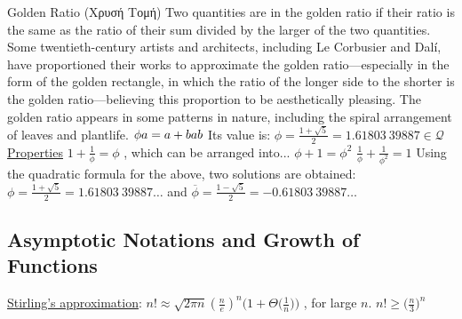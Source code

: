 \documentclass[12pt]{article}
\begin{document}
\begin{flushleft}
	\textbullet \quad Golden Ratio (\textgreek{Χρυσή Τομή}) \linebreak 
   Two quantities are in the golden ratio if their ratio is the same as the ratio of their sum divided by the larger of the two quantities. Some twentieth-century artists and architects, including Le Corbusier and Dalí, have proportioned their works to approximate the golden ratio—especially in the form of the golden rectangle, in which the ratio of the longer side to the shorter is the golden ratio—believing this proportion to be aesthetically pleasing. The golden ratio appears in some patterns in nature, including the spiral arrangement of leaves and plantlife. \linebreak 
   	$\displaystyle \phi \def \frac{a+b}{a} = \frac{a}{b}$ \linebreak 
	Its value is: $\displaystyle \phi = \frac{1+\sqrt{5}}{2} = 1.61803\ 39887 \in \mathcal{Q} $ \linebreak 
	\uline{Properties} \linebreak 
	\textbullet \quad $\displaystyle 1+\frac{1}{\phi} = \phi $ , which can be arranged into... \linebreak 
	\textbullet \quad $\displaystyle \phi +1=\phi ^2$ \linebreak 
	\textbullet \quad $\displaystyle \frac{1}{\phi} + \frac{1}{\phi^2} = 1$ \linebreak 
	\textbullet \quad Using the quadratic formula for the above, two solutions are obtained: \linebreak 
	$\displaystyle \phi =\frac {1+{\sqrt {5}}}{2}= 1.61803\ 39887 \ldots$ and $\displaystyle \overline{\phi} =\frac {1-{\sqrt {5}}}{2} = -0.61803\ 39887 \dots $ \linebreak 
	
		\subsection{Asymptotic Notations and Growth of Functions}
	
	\textbullet \quad \uline{Stirling's approximation}: $\displaystyle n! \approx \sqrt{2\pi n} \left(\frac{n}{e}\right)^n \Bigg(1 + \Theta \Big(\frac{1}{n}\Big) \Bigg) $ , for large $n$. \linebreak	
	\textbullet \quad $ n! \geq \Big( \frac{n}{3} \Big)^n $ \linebreak 	
	

\end{flushleft}
\end{document}

